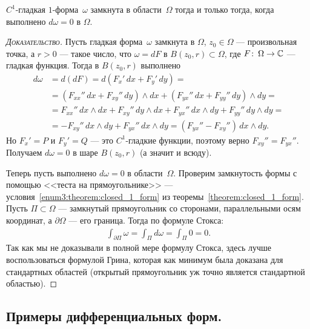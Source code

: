 \documentclass[../complex-analysis.tex]{subfiles}
\begin{document}
\begin{thm}
 \label{theorem:smooth_form_closed}
 $ C^{1} $-гладкая $ 1 $-форма~$ \omega $ замкнута в области~$ \Omega $ тогда и только тогда, когда выполнено $ d \omega = 0 $ в $ \Omega $.
\end{thm}
\begin{proof}[\normalfont\textsc{Доказательство}]
 Пусть гладкая форма~$ \omega $ замкнута в $ \Omega $, $ z_0 \in \Omega $ --- произвольная точка, а $ r > 0 $ --- такое число, что $ \omega = d F $ в $ B(z_0,r) \subset \Omega $, где $ F \colon\,\Omega\to\mathbb{C} $ --- гладкая функция. Тогда в $ B(z_0,r) $ выполнено
 \begin{align*}
  d\omega&=d(dF) = d \left( F_x'\,dx + F_y'\,dy \right) = \\
  &= \left( F_{x x}''\,dx + F_{x y}''\,dy \right)\land dx + \left( F_{y x}''\,dx + F_{y y}''\,dy \right)\land dy = \\
  &= F_{x x}''\,dx \land dx + F_{xy}''\,dy \land dx + F_{yx}''\,dx\land dy + F_{y y}''\,dy \land dy = \\
  &= -F_{xy}''\,dx\land dy + F_{yx}''\,dx \land dy = (F_{yx}'' - F_{xy}'')\,dx\land dy.
 \end{align*} Но $ F_x' = P $ и $ F_y' = Q $ --- это $ C^{1} $-гладкие функции, поэтому верно $ F_{xy}'' = F_{yx}'' $. Получаем $ d\omega=0 $ в шаре $ B(z_0,r) $ (а значит и всюду).

 Теперь пусть выполнено $d \omega = 0$ в области~$\Omega$. Проверим замкнутость формы с помощью <<теста на прямоугольнике>> --- условия~\ref{enum3:theorem:closed_1_form} из теоремы~\ref{theorem:closed_1_form}. Пусть $ \Pi \subset \Omega $ --- замкнутый прямоугольник со сторонами, параллельными осям координат, а $ \partial\Omega $ --- его граница. Тогда по формуле Стокса:
 \begin{align*}
  \int_{\partial\Pi} \omega = \int_{\Pi} d\omega = \int_{\Pi} 0 = 0. 
 \end{align*} Так как мы не доказывали в полной мере формулу Стокса, здесь лучше воспользоваться формулой Грина, которая как минимум была доказана для стандартных областей (открытый прямоугольник уж точно является стандартной областью).
\end{proof}

\subsection{Примеры дифференциальных форм.}
\end{document}
